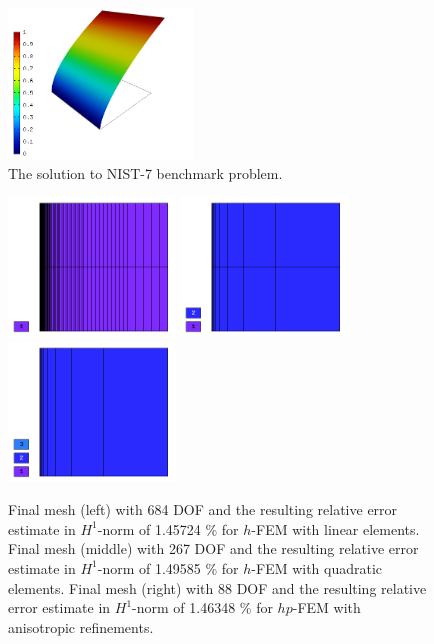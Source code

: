 \documentclass[12pt]{elsarticle}
\begin{document}
\begin{figure}[!ht]
\centering
\includegraphics[height=4cm]{nist/nist-7/solution.png}
\caption{The solution to NIST-7 benchmark problem.}
\label{fig:sln-nist07}
\end{figure}

\begin{figure}[!ht]
\centering
\includegraphics[height=3.7cm]{nist/nist-7/mesh_h1_aniso.png}
\includegraphics[height=3.7cm]{nist/nist-7/mesh_h2_aniso.png}
\includegraphics[height=3.7cm]{nist/nist-7/mesh_hp_aniso.png}
\caption{
Final mesh (left) with 684 DOF and the resulting
relative error estimate in $H^1$-norm of 1.45724 \% for $h$-FEM with linear elements.
Final mesh (middle) with 267 DOF and the resulting
relative error estimate in $H^1$-norm of 1.49585 \% for $h$-FEM with quadratic elements.
Final mesh (right) with 88 DOF and the resulting
relative error estimate in $H^1$-norm of 1.46348 \% for $hp$-FEM with anisotropic refinements.}
\label{fig:nist-7-hp-aniso}
\end{figure}
\end{document}
